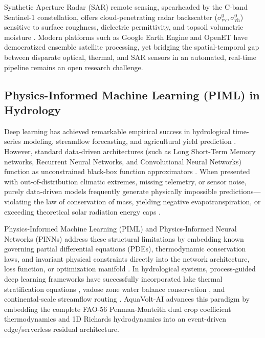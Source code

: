 \documentclass[sn-mathphys-num,Numbered]{sn-jnl}
\begin{document}
Synthetic Aperture Radar (SAR) remote sensing, spearheaded by the C-band Sentinel-1 constellation, offers cloud-penetrating radar backscatter ($\sigma^0_{\text{vv}}, \sigma^0_{\text{vh}}$) sensitive to surface roughness, dielectric permittivity, and topsoil volumetric moisture \cite{Torres2012,Dubois1995,Zribi2005,Attema1978,Ulaby1984}. Modern platforms such as Google Earth Engine \cite{Gorelick2017} and OpenET have democratized ensemble satellite processing, yet bridging the spatial-temporal gap between disparate optical, thermal, and SAR sensors in an automated, real-time pipeline remains an open research challenge.

\subsection{Physics-Informed Machine Learning (PIML) in Hydrology}\label{sec:related_piml}
Deep learning has achieved remarkable empirical success in hydrological time-series modeling, streamflow forecasting, and agricultural yield prediction \cite{Sarker2021,Alzubaidi2021,Benos2021,Kamilaris2018}. However, standard data-driven architectures (such as Long Short-Term Memory networks, Recurrent Neural Networks, and Convolutional Neural Networks) function as unconstrained black-box function approximators \cite{Li2021CNN,Hassija2023}. When presented with out-of-distribution climatic extremes, missing telemetry, or sensor noise, purely data-driven models frequently generate physically impossible predictions—violating the law of conservation of mass, yielding negative evapotranspiration, or exceeding theoretical solar radiation energy caps \cite{Read2019,Reichstein2019}.

Physics-Informed Machine Learning (PIML) and Physics-Informed Neural Networks (PINNs) address these structural limitations by embedding known governing partial differential equations (PDEs), thermodynamic conservation laws, and invariant physical constraints directly into the network architecture, loss function, or optimization manifold \cite{Karniadakis2021,Raissi2019,Lu2021,Willard2022}. In hydrological systems, process-guided deep learning frameworks have successfully incorporated lake thermal stratification equations \cite{Read2019,Jia2019,Daw2020}, vadose zone water balance conservation \cite{Zhao2019}, and continental-scale streamflow routing \cite{Shen2021,Kashinath2021}. AquaVolt-AI advances this paradigm by embedding the complete FAO-56 Penman-Monteith dual crop coefficient thermodynamics \cite{Allen1998} and 1D Richards hydrodynamics \cite{Richards1931,vanGenuchten1980} into an event-driven edge/serverless residual architecture.
\end{document}
